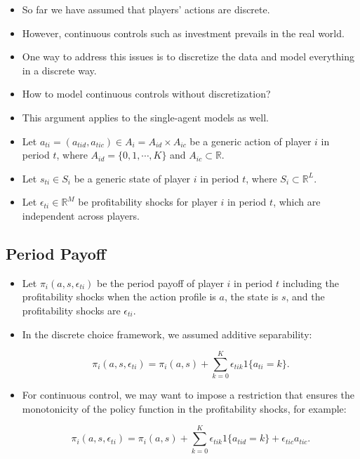\documentclass[]{book}
\providecommand{\tightlist}{%
  \setlength{\itemsep}{0pt}\setlength{\parskip}{0pt}}
\begin{document}
\begin{itemize}
\tightlist
\item
  So far we have assumed that players' actions are discrete.
\item
  However, continuous controls such as investment prevails in the real
  world.
\item
  One way to address this issues is to discretize the data and model
  everything in a discrete way.
\item
  How to model continuous controls without discretization?
\item
  This argument applies to the single-agent models as well.
\item
  Let \(a_{ti} = (a_{tid}, a_{tic}) \in A_i = A_{id} \times A_{ic}\) be
  a generic action of player \(i\) in period \(t\), where
  \(A_{id} = \{0, 1, \cdots, K\}\) and \(A_{ic} \subset \mathbb{R}\).
\item
  Let \(s_{ti} \in S_i\) be a generic state of player \(i\) in period
  \(t\), where \(S_i \subset \mathbb{R}^L\).
\item
  Let \(\epsilon_{ti} \in \mathbb{R}^M\) be profitability shocks for
  player \(i\) in period \(t\), which are independent across players.
\end{itemize}

\subsection{Period Payoff}\label{period-payoff-1}

\begin{itemize}
\tightlist
\item
  Let \(\pi_i(a, s, \epsilon_{ti})\) be the period payoff of player
  \(i\) in period \(t\) including the profitability shocks when the
  action profile is \(a\), the state is \(s\), and the profitability
  shocks are \(\epsilon_{ti}\).
\item
  In the discrete choice framework, we assumed additive separability:

  \begin{equation}
  \pi_i(a, s, \epsilon_{ti}) = \pi_i(a, s) + \sum_{k = 0}^K \epsilon_{tik}1\{a_{ti} = k\}.
  \end{equation}
\item
  For continuous control, we may want to impose a restriction that
  ensures the monotonicity of the policy function in the profitability
  shocks, for example:

  \begin{equation}
  \pi_i(a, s, \epsilon_{ti}) = \pi_i(a, s) + \sum_{k = 0}^K \epsilon_{tik} 1\{a_{tid} = k\} + \epsilon_{tic} a_{tic}.
  \end{equation}
\end{itemize}
\end{document}
